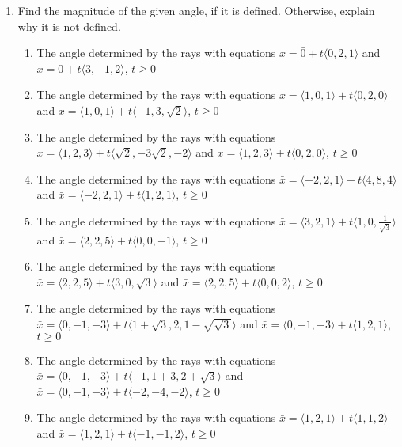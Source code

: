 \begin{exercisebox}
\begin{enumerate}[series=AngleEX]
  \item Find the magnitude of the given angle, if it is defined. Otherwise, explain why it is not defined.
  \begin{enumerate}
    \item The angle determined by the rays with equations $\bar{x} = \bar{0} + t\langle 0, 2, 1 \rangle$ and $\bar{x} = \bar{0} + t\langle 3, -1, 2 \rangle$, $t \geq 0$
    \item The angle determined by the rays with equations $\bar{x} = \langle 1, 0, 1 \rangle + t\langle 0, 2, 0 \rangle$ and $\bar{x} = \langle 1, 0, 1 \rangle + t\langle -1, 3, \sqrt{2} \rangle$, $t \geq 0$
    \item The angle determined by the rays with equations $\bar{x} = \langle 1, 2, 3 \rangle + t\langle \sqrt{2}, -3\sqrt{2}, -2 \rangle$ and $\bar{x} = \langle 1, 2, 3 \rangle + t\langle 0, 2, 0 \rangle$, $t \geq 0$
    \item The angle determined by the rays with equations $\bar{x} = \langle -2, 2, 1 \rangle + t\langle 4, 8, 4 \rangle$ and $\bar{x} = \langle -2, 2, 1 \rangle + t\langle 1, 2, 1 \rangle$, $t \geq 0$
    \item The angle determined by the rays with equations $\bar{x} = \langle 3, 2, 1 \rangle + t\langle 1, 0, \frac{1}{\sqrt{3}} \rangle$ and $\bar{x} = \langle 2, 2, 5 \rangle + t\langle 0, 0, -1 \rangle$, $t \geq 0$
    \item The angle determined by the rays with equations $\bar{x} = \langle 2, 2, 5 \rangle + t\langle 3, 0, \sqrt{3} \rangle$ and $\bar{x} = \langle 2, 2, 5 \rangle + t\langle 0, 0, 2 \rangle$, $t \geq 0$
    \item The angle determined by the rays with equations $\bar{x} = \langle 0, -1, -3 \rangle + t\langle 1+\sqrt{3}, 2, 1 - \sqrt{\sqrt{3}} \rangle$ and $\bar{x} = \langle 0, -1, -3 \rangle + t\langle 1, 2, 1 \rangle$, $t \geq 0$
    \item The angle determined by the rays with equations $\bar{x} = \langle 0, -1, -3 \rangle + t\langle -1, 1 + 3, 2 + \sqrt{3} \rangle$ and $\bar{x} = \langle 0, -1, -3 \rangle + t\langle -2, -4, -2 \rangle$, $t \geq 0$
    \item The angle determined by the rays with equations $\bar{x} = \langle 1, 2, 1 \rangle + t\langle 1, 1, 2 \rangle$ and $\bar{x} = \langle 1, 2, 1 \rangle + t\langle -1, -1, 2 \rangle$, $t \geq 0$
  \end{enumerate}


\end{enumerate}
\end{exercisebox}
